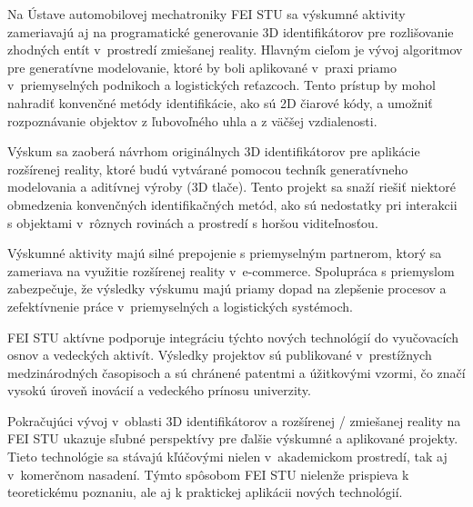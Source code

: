 Na Ústave automobilovej mechatroniky FEI STU sa výskumné aktivity zameriavajú aj na programatické generovanie 3D identifikátorov pre rozlišovanie zhodných entít v~prostredí zmiešanej reality. Hlavným cieľom je vývoj algoritmov pre generatívne modelovanie, ktoré by boli aplikované v~praxi priamo v~priemyselných podnikoch a logistických reťazcoch. Tento prístup by mohol nahradiť konvenčné metódy identifikácie, ako sú 2D čiarové kódy, a umožniť rozpoznávanie objektov z ľubovoľného uhla a z väčšej vzdialenosti.

Výskum sa zaoberá návrhom originálnych 3D identifikátorov pre aplikácie rozšírenej reality, ktoré budú vytvárané pomocou techník generatívneho modelovania a aditívnej výroby (3D tlače). Tento projekt sa snaží riešiť niektoré obmedzenia konvenčných identifikačných metód, ako sú nedostatky pri interakcii s objektami v~rôznych rovinách a prostredí s horšou viditeľnosťou.

Výskumné aktivity majú silné prepojenie s priemyselným partnerom, ktorý sa zameriava na využitie rozšírenej reality v~e-commerce. Spolupráca s priemyslom zabezpečuje, že výsledky výskumu majú priamy dopad na zlepšenie procesov a zefektívnenie práce v~priemyselných a logistických systémoch.

FEI STU aktívne podporuje integráciu týchto nových technológií do vyučovacích osnov a vedeckých aktivít. Výsledky projektov sú publikované v~prestížnych medzinárodných časopisoch a sú chránené patentmi a úžitkovými vzormi, čo značí vysokú úroveň inovácií a vedeckého prínosu univerzity.

Pokračujúci vývoj v~oblasti 3D identifikátorov a rozšírenej / zmiešanej reality na FEI STU ukazuje sľubné perspektívy pre ďalšie výskumné a aplikované projekty. Tieto technológie sa stávajú kľúčovými nielen v~akademickom prostredí, tak aj v~komerčnom nasadení. Týmto spôsobom FEI STU nielenže prispieva k teoretickému poznaniu, ale aj k praktickej aplikácii nových technológií.



